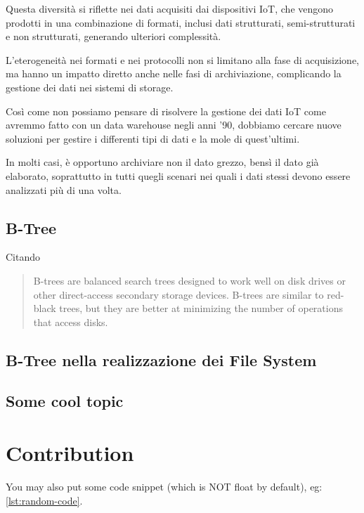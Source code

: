 \documentclass[12pt,a4paper,openright,twoside]{book}
\begin{document}
        Questa diversità si riflette nei dati acquisiti dai dispositivi \ac{IoT}, che vengono prodotti in una combinazione di formati, inclusi dati strutturati, semi-strutturati e non strutturati, generando ulteriori complessità.

        L'eterogeneità nei formati e nei protocolli non si limitano alla fase di acquisizione, ma hanno un impatto diretto anche nelle fasi di archiviazione, complicando la gestione dei dati nei sistemi di storage.

        Così come non possiamo pensare di risolvere la gestione dei dati \ac{IoT} come avremmo fatto con un data warehouse negli anni '90, dobbiamo cercare nuove soluzioni per gestire i differenti tipi di dati e la mole di quest'ultimi.

        In molti casi, è opportuno archiviare non il dato grezzo, bensì il dato già elaborato, soprattutto in tutti quegli scenari nei quali i dati stessi devono essere analizzati più di una volta.

\section{B-Tree}

    Citando
    \begin{quote}
        B-trees are balanced search trees designed to work well on disk drives or other direct-access secondary storage devices. B-trees are similar to red-black trees, but they are better at minimizing the number of operations that access disks.
    \end{quote}

\section{B-Tree nella realizzazione dei File System}

\section{Some cool topic}

\chapter{Contribution}

You may also put some code snippet (which is NOT float by default), eg: \cref{lst:random-code}.


\end{document}
